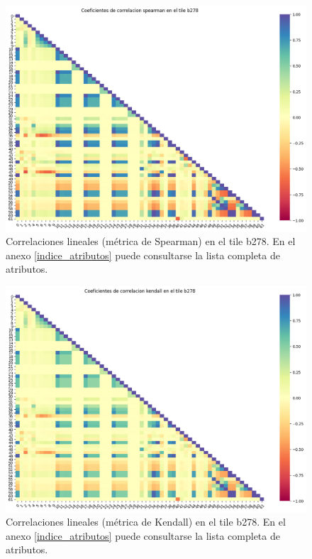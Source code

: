 \begin{figure}[h!]
\centering
  \includegraphics[width=1\textwidth]{Kap6/spearman_b278_MATRIX.png}
\caption{ Correlaciones lineales (métrica de Spearman) en el tile b278. En el anexo \protect\ref{indice_atributos} puede consultarse la lista completa de atributos. }
\label{fig:correlation_matrix_b278_sp}
\end{figure}

\begin{figure}[h!]
\centering
  \includegraphics[width=1\textwidth]{Kap6/kendall_b278_MATRIX.png}
\caption{ Correlaciones lineales (métrica de Kendall) en el tile b278. En el anexo \protect\ref{indice_atributos} puede consultarse la lista completa de atributos. }
\label{fig:correlation_matrix_b278_ke}
\end{figure}


